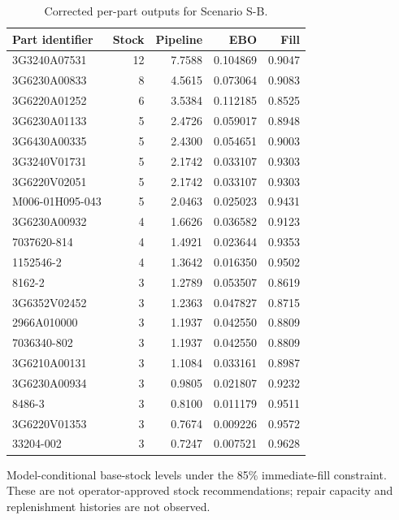 \begin{table}[htbp]
\centering
\small
\caption{Corrected per-part outputs for Scenario S-B.}
\label{tab:a1-metric-parts}
\begin{tabular}{lrrrr}
\toprule
Part identifier & Stock & Pipeline & EBO & Fill \\
\midrule
3G3240A07531 & 12 & 7.7588 & 0.104869 & 0.9047 \\
3G6230A00833 & 8 & 4.5615 & 0.073064 & 0.9083 \\
3G6220A01252 & 6 & 3.5384 & 0.112185 & 0.8525 \\
3G6230A01133 & 5 & 2.4726 & 0.059017 & 0.8948 \\
3G6430A00335 & 5 & 2.4300 & 0.054651 & 0.9003 \\
3G3240V01731 & 5 & 2.1742 & 0.033107 & 0.9303 \\
3G6220V02051 & 5 & 2.1742 & 0.033107 & 0.9303 \\
M006-01H095-043 & 5 & 2.0463 & 0.025023 & 0.9431 \\
3G6230A00932 & 4 & 1.6626 & 0.036582 & 0.9123 \\
7037620-814 & 4 & 1.4921 & 0.023644 & 0.9353 \\
1152546-2 & 4 & 1.3642 & 0.016350 & 0.9502 \\
8162-2 & 3 & 1.2789 & 0.053507 & 0.8619 \\
3G6352V02452 & 3 & 1.2363 & 0.047827 & 0.8715 \\
2966A010000 & 3 & 1.1937 & 0.042550 & 0.8809 \\
7036340-802 & 3 & 1.1937 & 0.042550 & 0.8809 \\
3G6210A00131 & 3 & 1.1084 & 0.033161 & 0.8987 \\
3G6230A00934 & 3 & 0.9805 & 0.021807 & 0.9232 \\
8486-3 & 3 & 0.8100 & 0.011179 & 0.9511 \\
3G6220V01353 & 3 & 0.7674 & 0.009226 & 0.9572 \\
33204-002 & 3 & 0.7247 & 0.007521 & 0.9628 \\
\bottomrule
\end{tabular}
\par\smallskip
{\footnotesize Model-conditional base-stock levels under the 85\% immediate-fill constraint. These are not operator-approved stock recommendations; repair capacity and replenishment histories are not observed.}
\end{table}
